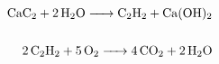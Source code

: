 \documentclass{article}
\begin{document}
\begin{align*}
\ce{CaC2 + 2 H2O -> C2H2 + Ca(OH)2} \\
\\
\ce{2 C2H2 + 5 O2 -> 4 CO2 + 2 H2O}
\end{align*}
\end{document}
